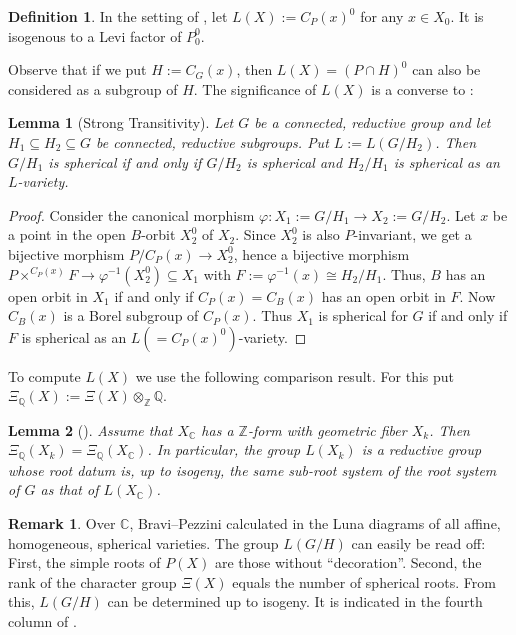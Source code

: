 \documentclass[12pt]{amsart}
\renewcommand{\phi}{\varphi}
\newcommand\BBC{{\mathbb C}}
\newcommand\BBQ{{\mathbb Q}}
\newcommand\BBZ{{\mathbb Z}}
\numberwithin{equation}{section}
\newtheorem{lemma}[lemma]{Lemma}
\theoremstyle{definition}
\newtheorem{definition}[definition]{Definition}
\newtheorem{remark}[remark]{Remark}
\begin{document}
\begin{definition}\label{def:LX}
  In the setting of , let $L(X):=C_P(x)^0$ for any $x\in X_0$. It is
  isogenous to a Levi factor of $P_0^0$.
\end{definition}

Observe that if we put $H:=C_G(x)$, then $L(X)=(P\cap H)^0$ can also be
considered as a subgroup of $H$. The significance of $L(X)$ is a
converse to :

\begin{lemma}[Strong Transitivity]\label{lemma:hard}
  Let $G$ be a connected, reductive group and let
  $H_1\subseteq H_2\subseteq G$ be connected, reductive subgroups. Put
  $L:=L(G/H_2)$. Then $G/H_1$ is spherical if and only if $G/H_2$ is
  spherical and $H_2/H_1$ is spherical as an $L$-variety.
\end{lemma}

\begin{proof}
  Consider the canonical morphism $\phi:X_1:=G/H_1\to X_2:=G/H_2$. Let $x$ be a
  point in the open $B$-orbit $X_2^0$ of $X_2$. Since $X_2^0$ is also
  $P$-invariant, we get a bijective morphism $P/C_P(x)\to X_2^0$, hence a
  bijective morphism
  $P\times^{C_P(x)}F\to\phi^{-1}(X_2^0)\subseteq X_1$ with
  $F :=\phi^{-1}(x)\cong H_2/H_1$. Thus, $B$ has an open orbit in $X_1$
  if and only if $C_P(x)=C_B(x)$ has an open orbit in $F$. Now
  $C_B(x)$ is a Borel subgroup of $C_P(x)$. Thus $X_1$ is spherical for $G$ if
  and only if $F$ is spherical as an $L (=C_P(x)^0)$-variety.
\end{proof}

To compute $L(X)$ we use the following comparison result. For this put
$\Xi_\BBQ(X):=\Xi(X)\otimes_\BBZ\BBQ$.

 \begin{lemma}[{\cite[Lem.~3.7]{Knop5}}]
   Assume that $X_\BBC$ has a $\BBZ$-form with geometric fiber $X_k$.  Then
   $\Xi_\BBQ(X_k)=\Xi_\BBQ(X_\BBC)$. In particular, the group $L(X_k)$
   is a reductive group whose root datum is, up to isogeny, the same
   sub-root system of the root system of $G$ as that of $L(X_\BBC)$.
 \end{lemma}

\begin{remark}
  Over $\BBC$, Bravi--Pezzini calculated in \cite{BrPezz} the Luna
  diagrams of all affine, homogeneous, spherical varieties. The group
  $L(G/H)$ can easily be read off: First, the simple roots of $P(X)$
  are those without ``decoration''. Second, the rank of the character
  group $\Xi(X)$ equals the number of spherical roots. From this,
  $L(G/H)$ can be determined up to isogeny. It is indicated in the
  fourth column of .
\end{remark}
\end{document}
